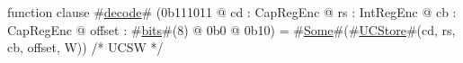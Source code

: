 function clause #\hyperref[zdecode]{decode}# (0b111011 @ cd : CapRegEnc @ rs : IntRegEnc @ cb : CapRegEnc @ offset : #\hyperref[zbits]{bits}#(8) @ 0b0 @ 0b10) = #\hyperref[zSome]{Some}#(#\hyperref[zUCStore]{UCStore}#(cd, rs, cb, offset, W)) /* UCSW */

